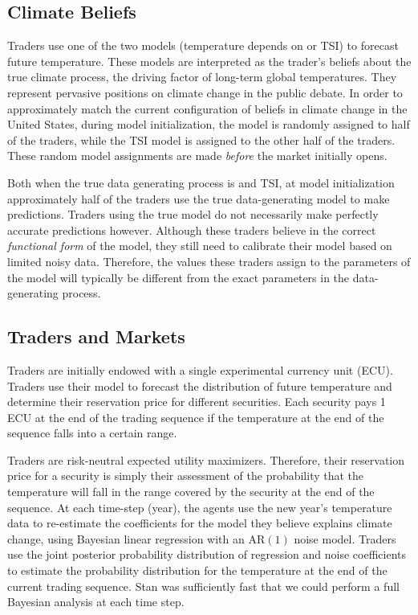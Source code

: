 \documentclass{wscpaperproc}\usepackage[]{graphicx}\usepackage[]{color}
\newcommand{\AR}{\text{AR}}
\begin{document}
\subsection{Climate Beliefs}

Traders use one of the two models (temperature depends on  or TSI) to forecast future temperature.
These models are interpreted as the trader's beliefs about the true climate process, the driving factor of long-term global temperatures.
They represent pervasive positions on climate change in the public debate. In order to approximately match the current configuration of beliefs in climate change in the United States, during model initialization, the  model is randomly assigned to half of the traders, while the TSI model is assigned to the other half of the traders. These random model assignments are made \emph{before} the market initially opens.

Both when the true data generating process is  and TSI, at model initialization approximately half of the traders use the true data-generating model to make predictions.
Traders using the true model do not necessarily make perfectly accurate predictions however.
Although these traders believe in the correct \emph{functional form\/} of the model, they still need to calibrate their model based on limited noisy data.
Therefore, the values these traders assign to the parameters of the model will typically be different from the exact parameters in the data-generating process.

\subsection{Traders and Markets}

Traders are initially endowed with a single experimental currency unit (ECU).
Traders use their model to forecast the distribution of future temperature and determine their reservation price for different securities. Each security pays 1 ECU at the end of the trading sequence if the temperature at the end of the sequence falls into a certain range.

Traders are risk-neutral expected utility maximizers.
Therefore, their reservation price for a security is simply their assessment of the probability that the temperature will fall in the range covered by the security at the end of the sequence.
At each time-step (year), the agents use the new year's temperature data to re-estimate the coefficients for the model they believe explains climate change, using Bayesian linear regression with an $\AR(1)$ noise model. Traders use the joint posterior probability distribution of regression and noise coefficients to estimate the probability distribution for the  temperature at the end of the current trading sequence. Stan was sufficiently fast that we could perform a full Bayesian analysis at each time step.
\end{document}
